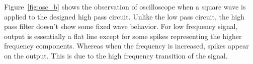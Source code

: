 \documentclass{lab_sheet}
\begin{document}
   Figure~\ref{fig:osc_b} shows the observation of oscilloscope when a square wave is applied to the designed high pass circuit. Unlike the low pass circuit, the high pass filter doesn't show some fixed wave behavior. For low frequency signal, output is essentially a flat line except for some spikes representing the higher frequency components. Whereas when the frequency is increased, spikes appear on the output. This is due to the high frequency transition of the signal.
   

\end{document}
